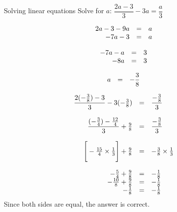 \begin{wex}
{Solving linear equations}
{Solve for $a$: $\dfrac{2a-3}{3}-3a=\dfrac{a}{3}$}
{

\begin{equation*}
    \begin{array}{cccc}\hfill 2a-3 - 9a &= &a\hfill & \\ 
\hfill -7a - 3 &= &a\hfill & 
    \end{array}
\end{equation*}

\begin{equation*}
    \begin{array}{cccc}\hfill -7a -a &= &3\hfill & \\ 
\hfill -8a &= &3\hfill & \\
    \end{array}
\end{equation*}

\begin{equation*}
    \begin{array}{cccc}\hfill a &= & -\dfrac{3}{8}\hfill & \\ 

    \end{array}
\end{equation*}

\begin{equation*}
    \begin{array}{ccll}\hfill \dfrac{2(-\frac{3}{8}) - 3}{3} - 3(-\frac{3}{8}) &= & \dfrac{-\frac{3}{8}}{3}\hfill & \\ 
\\
      \hfill \dfrac{(-\frac{3}{4}) - \frac{12}{4}}{3} + \frac{9}{8} &= & \dfrac{-\frac{3}{8}}{3}\hfill & \\ 
\\
 \hfill \Bigg[-\frac{15}{4} \times \frac{1}{3}\Bigg] + \frac{9}{8} &= & -\frac{3}{8} \times \frac{1}{3}\hfill & \\ 
\\
 \hfill -\frac{5}{4} + \frac{9}{8} &= & -\frac{1}{8}\hfill & \\ 
 \hfill -\frac{10}{8} + \frac{9}{8} &= & -\frac{1}{8}\hfill & \\ 
 \hfill -\frac{1}{8} &= & -\frac{1}{8}\hfill & 
    \end{array}
\end{equation*}
Since both sides are equal, the answer is correct. 
}
\end{wex}

